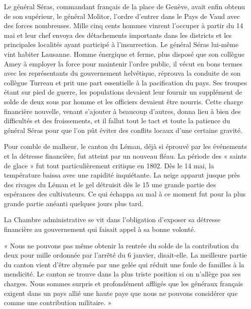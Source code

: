 \documentclass[french,twoside]{book} %
\newenvironment{quoteblock}%
  {\begin{quoting}}
  {\end{quoting}}
\newenvironment{quotebar}{%
    \def\FrameCommand{{\color{rubric!10!}\vrule width 0.5em} \hspace{0.9em}}%
    \def\OuterFrameSep{\itemsep} %
    \MakeFramed {\advance\hsize-\width \FrameRestore}
  }%
  {%
    \endMakeFramed
  }
\renewenvironment{quoteblock}%
  {%
    \savenotes
    \setstretch{0.9}
    \begin{quotebar}
  }
  {%
    \end{quotebar}
    \spewnotes
  }
\begin{document}
\noindent Le général Séras, commandant français de la place de Genève, avait enfin obtenu de son supérieur, le général Molitor, l’ordre d’entrer dans le Pays de Vaud avec des forces nombreuses. Mille cinq cents hommes vinrent l’occuper à partir du 14 mai et leur chef envoya des détachements importants dans les districts et les principales localités ayant participé à l’insurrection. Le général Séras lui-même vint habiter Lausanne. Homme énergique et ferme, plus disposé que son collègue Amey à employer la force pour maintenir l’ordre public, il vécut en bons termes avec les représentants du gouvernement helvétique, réprouva la conduite de son collègue Turreau et prit une part essentielle à la pacification du pays. Ses troupes étant sur pied de guerre, les populations devaient leur fournir un supplément de solde de deux sous par homme et les officiers devaient être nourris. Cette charge financière nouvelle, venant s’ajouter à beaucoup d’autres, donna lieu à bien des difficultés et des froissements, et il fallut tout le tact et toute la patience du général Séras pour que l’on pût éviter des conflits locaux d’une certaine gravité.\par
Pour comble de malheur, le canton du Léman, déjà si éprouvé par les événements et la détresse financière, fut atteint par un nouveau fléau. La période des « saints de glace » fut tout particulièrement critique en 1802. Dès le 14 mai, la température baissa avec une rapidité inquiétante. La neige apparut jusque près des rivages du Léman et le gel détruisit dès le 15 une grande partie des espérances des cultivateurs. Ce qui échappa au mal à ce moment fut pour la plus grande partie anéanti quelques jours plus tard.\par
La Chambre administrative se vit dans l’obligation d’exposer sa détresse financière au gouvernement qui faisait appel à sa bonne volonté.\par

\begin{quoteblock}
 \noindent « Nous ne pouvons pas même obtenir la rentrée du solde de la contribution du deux pour mille ordonnée par l’arrêté du 6 janvier, disait-elle. La meilleure partie du canton vient d’être abymée par une gelée qui réduit une foule de familles à la mendicité. Le canton se trouve dans la plus triste position si on n’allège pas ses charges. Nous sommes surpris et profondément affligés que les généraux français exigent dans un pays allié une haute paye que nous ne pouvons considérer que comme une contribution militaire. »
 \end{quoteblock}
\end{document}

